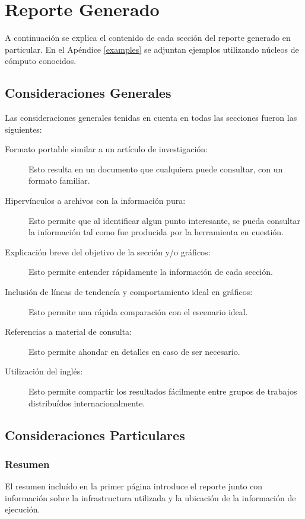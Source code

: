 \documentclass[a4paper]{report}
\begin{document}
\section{Reporte Generado}

A continuación se explica el contenido de cada sección del reporte generado en particular.
En el Apéndice \ref{examples} se adjuntan ejemplos utilizando núcleos de cómputo conocidos.

\subsection{Consideraciones Generales}

Las consideraciones generales tenidas en cuenta en todas las secciones fueron las siguientes:

\begin{description}
\item[Formato portable similar a un artículo de investigación:] Esto resulta en un documento que cualquiera puede consultar, con un formato familiar.
\item[Hipervínculos a archivos con la información pura:] Esto permite que al identificar algun punto interesante, se pueda consultar la información tal como fue producida por la herramienta en cuestión.
\item[Explicación breve del objetivo de la sección y/o gráficos:] Esto permite entender rápidamente la información de cada sección.
\item[Inclusión de líneas de tendencía y comportamiento ideal en gráficos:] Esto permite una rápida comparación con el escenario ideal.
\item[Referencias a material de consulta:] Esto permite ahondar en detalles en caso de ser necesario.
\item[Utilización del inglés:] Esto permite compartir los resultados fácilmente entre grupos de trabajos distribuídos internacionalmente.
\end{description}

\subsection{Consideraciones Particulares}

\subsubsection{Resumen}

El resumen incluído en la primer página introduce el reporte junto con información sobre la infrastructura utilizada y la ubicación de la información de ejecución.
\end{document}
